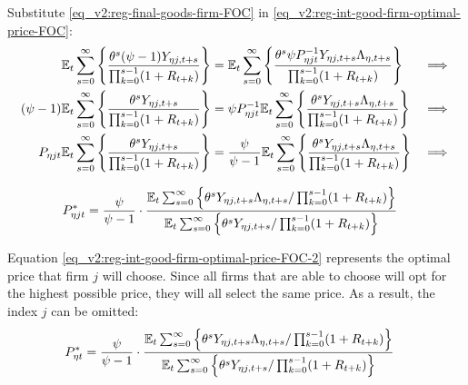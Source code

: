 \documentclass[../thesis.tex]{subfiles}
\begin{document}
Substitute \ref{eq_v2:reg-final-goods-firm-FOC} in \ref{eq_v2:reg-int-good-firm-optimal-price-FOC}:
\begin{alignat}{2}
	{\mathbb{E}_{t}} \sum_{s=0}^{\infty} \Bigg\{ \frac{\theta^s (\psi-1) Y_{\eta j,t+s}}{\prod_{k=0}^{s-1}(1+R_{t+k})} \Bigg\} &= {\mathbb{E}_{t}} \sum_{s=0}^{\infty} \Bigg\{ \frac{\theta^s \psi P_{\eta jt}^{-1} Y_{\eta j,t+s} \Lambda_{\eta, t+s}}{\prod_{k=0}^{s-1}(1+R_{t+k})}  \Bigg\} &\implies \nonumber \\
	(\psi-1) {\mathbb{E}_{t}} \sum_{s=0}^{\infty} \Bigg\{ \frac{\theta^s Y_{\eta j,t+s}}{\prod_{k=0}^{s-1}(1+R_{t+k})} \Bigg\} &= \psi P_{\eta jt}^{-1} {\mathbb{E}_{t}} \sum_{s=0}^{\infty} \Bigg\{ \frac{\theta^s Y_{\eta j,t+s} \Lambda_{\eta, t+s}}{\prod_{k=0}^{s-1}(1+R_{t+k})}  \Bigg\} &\implies \nonumber \\
	P_{\eta jt} {\mathbb{E}_{t}} \sum_{s=0}^{\infty} \Bigg\{ \frac{\theta^s Y_{\eta j,t+s}}{\prod_{k=0}^{s-1}(1+R_{t+k})} \Bigg\} &= \frac{\psi}{\psi-1} {\mathbb{E}_{t}} \sum_{s=0}^{\infty} \Bigg\{ \frac{\theta^s Y_{\eta j,t+s} \Lambda_{\eta, t+s}}{\prod_{k=0}^{s-1}(1+R_{t+k})}  \Bigg\} &\implies \nonumber
\end{alignat}

\vspace*{-1cm}

\begin{align}
	\label{eq_v2:reg-int-good-firm-optimal-price-FOC-2}
	P_{\eta jt}^{\ast} &= 
	\frac{\psi}{\psi-1} \cdot
	\frac{
		{\mathbb{E}_{t}} \sum_{s=0}^{\infty} \left\{ 
		\theta^s Y_{\eta j,t+s} \Lambda_{\eta, t+s} / \prod_{k=0}^{s-1}(1+R_{t+k}) \right\}} {{\mathbb{E}_{t}} \sum_{s=0}^{\infty} \left\{
		\theta^s Y_{\eta j,t+s} / \prod_{k=0}^{s-1}(1+R_{t+k}) \right\}}
\end{align}


Equation \ref{eq_v2:reg-int-good-firm-optimal-price-FOC-2} represents the optimal price that firm $j$ will choose. Since all firms that are able to choose will opt for the highest possible price, they will all select the same price. As a result, the index $j$ can be omitted:
\begin{align}
	\label{eq_v2:reg-int-good-firm-optimal-price-FOC-3}
	P_{\eta t}^{\ast} &= 
	\frac{\psi}{\psi-1} \cdot
	\frac{
		{\mathbb{E}_{t}} \sum_{s=0}^{\infty} \left\{ 
		\theta^s Y_{\eta j,t+s} \Lambda_{\eta, t+s} / \prod_{k=0}^{s-1}(1+R_{t+k}) \right\}} {{\mathbb{E}_{t}} \sum_{s=0}^{\infty} \left\{
		\theta^s Y_{\eta j,t+s} / \prod_{k=0}^{s-1}(1+R_{t+k}) \right\}}
\end{align}

\end{document}
